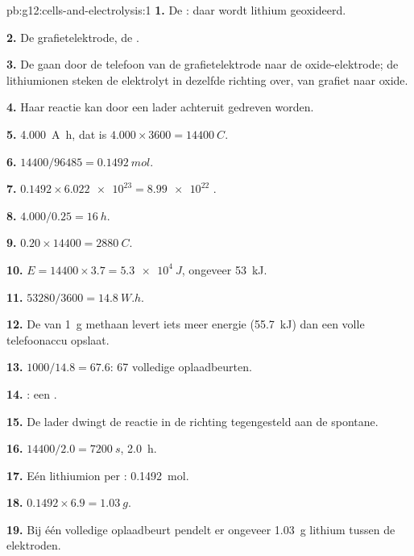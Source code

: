 \begin{solution}{pb:g12:cells-and-electrolysis:1}
\textbf{1.} De : daar wordt lithium geoxideerd.

\textbf{2.} De grafietelektrode, de .

\textbf{3.} De  gaan door de telefoon van de grafietelektrode
naar de oxide-elektrode; de lithiumionen steken de elektrolyt in dezelfde
richting over, van grafiet naar oxide.

\textbf{4.} Haar reactie kan door een lader achteruit gedreven worden.

\textbf{5.} \qty{4.000}{A.h}, dat is $4.000 \times 3600 =
\qty{14400}{C}$.

\textbf{6.} $14400/96485 = \qty{0.1492}{mol}$.

\textbf{7.} $0.1492 \times \num{6.022e23} = \num{8.99e22}$ .

\textbf{8.} $4.000/0.25 = \qty{16}{h}$.

\textbf{9.} $0.20 \times 14400 = \qty{2880}{C}$.

\textbf{10.} $E = 14400 \times 3.7 = \qty{5.3e4}{J}$, ongeveer
\qty{53}{kJ}.

\textbf{11.} $53280/3600 = \qty{14.8}{W.h}$.

\textbf{12.} De  van \qty{1}{g} methaan levert iets meer
energie (\qty{55.7}{kJ}) dan een volle telefoonaccu opslaat.

\textbf{13.} $1000/14.8 = 67.6$: 67 volledige oplaadbeurten.

\textbf{14.} : een .

\textbf{15.} De lader dwingt de reactie in de richting tegengesteld aan
de spontane.

\textbf{16.} $14400/2.0 = \qty{7200}{s}$, \qty{2.0}{h}.

\textbf{17.} Eén lithiumion per : \qty{0.1492}{mol}.

\textbf{18.} $0.1492 \times 6.9 = \qty{1.03}{g}$.

\textbf{19.} Bij één volledige oplaadbeurt pendelt er ongeveer
\qty{1.03}{g} lithium tussen de elektroden.
\end{solution}
